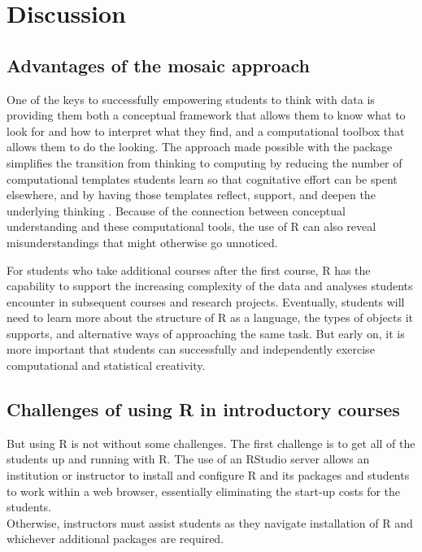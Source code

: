 \section{Discussion}\label{discussion}

\subsection{Advantages of the mosaic
approach}\label{advantages-of-the-mosaic-approach}

One of the keys to successfully empowering students to think with data
is providing them both a conceptual framework that allows them to know
what to look for and how to interpret what they find, and a
computational toolbox that allows them to do the looking. The approach
made possible with the  package simplifies the transition
from thinking to computing by reducing the number of computational
templates students learn so that cognitative effort can be spent
elsewhere, and by having those templates reflect, support, and deepen
the underlying thinking \citep{Grolemund:ISR:2014}. Because of the
connection between conceptual understanding and these computational
tools, the use of R can also reveal misunderstandings that might
otherwise go unnoticed.

For students who take additional courses after the first course, R has
the capability to support the increasing complexity of the data and
analyses students encounter in subsequent courses and research projects.
Eventually, students will need to learn more about the structure of R as
a language, the types of objects it supports, and alternative ways of
approaching the same task. But early on, it is more important that
students can successfully and independently exercise computational and
statistical creativity.

\subsection{Challenges of using R in introductory
courses}\label{challenges-of-using-r-in-introductory-courses}

But using R is not without some challenges. The first challenge is to
get all of the students up and running with R. The use of an RStudio
server allows an institution or instructor to install and configure R
and its packages and students to work within a web browser, essentially
eliminating the start-up costs for the students.\\
Otherwise, instructors must assist students as they navigate
installation of R and whichever additional packages are required.

